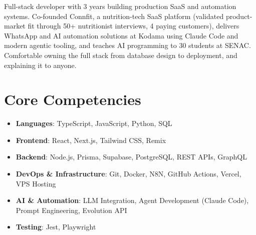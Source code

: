 \documentclass[11pt,a4paper,sans]{moderncv}
\begin{document}
\makecvtitle


\vspace{6pt}
\small{Full-stack developer with 3 years building production SaaS and automation systems. Co-founded Connfit, a nutrition-tech SaaS platform (validated product-market fit through 50+ nutritionist interviews, 4 paying customers), delivers WhatsApp and AI automation solutions at Kodama using Claude Code and modern agentic tooling, and teaches AI programming to 30 students at SENAC. Comfortable owning the full stack from database design to deployment, and explaining it to anyone.}


\section{Core Competencies}
\vspace{1pt}
\begin{itemize}

\item \textbf{Languages}: TypeScript, JavaScript, Python, SQL

\item \textbf{Frontend}: React, Next.js, Tailwind CSS, Remix

\item \textbf{Backend}: Node.js, Prisma, Supabase, PostgreSQL, REST APIs, GraphQL

\item \textbf{DevOps \& Infrastructure}: Git, Docker, N8N, GitHub Actions, Vercel, VPS Hosting

\item \textbf{AI \& Automation}: LLM Integration, Agent Development (Claude Code), Prompt Engineering, Evolution API

\item \textbf{Testing}: Jest, Playwright

\end{itemize}

\end{document}
